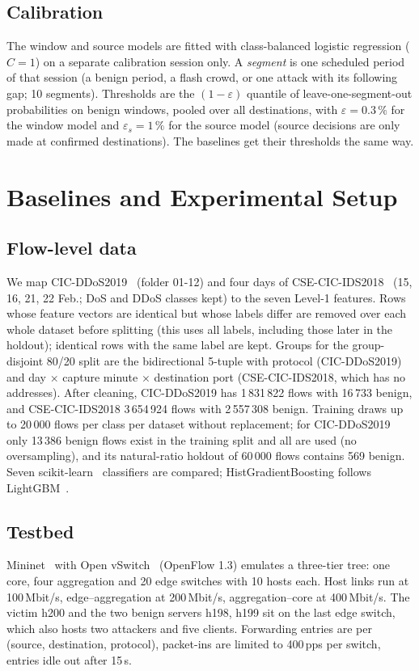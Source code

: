 \documentclass[conference]{IEEEtran}
\begin{document}
\subsection{Calibration}
The window and source models are fitted with class-balanced logistic regression ($C=1$) on a separate calibration session only. A \emph{segment} is one scheduled period of that session (a benign period, a flash crowd, or one attack with its following gap; 10 segments). Thresholds are the $(1-\varepsilon)$ quantile of leave-one-segment-out probabilities on benign windows, pooled over all destinations, with $\varepsilon=0.3\,\%$ for the window model and $\varepsilon_s=1\,\%$ for the source model (source decisions are only made at confirmed destinations). The baselines get their thresholds the same way.

\section{Baselines and Experimental Setup}\label{sec:setup}
\subsection{Flow-level data}
We map CIC-DDoS2019~\cite{sharafaldin2019ddos} (folder 01-12) and four days of CSE-CIC-IDS2018~\cite{sharafaldin2018toward} (15, 16, 21, 22 Feb.; DoS and DDoS classes kept) to the seven Level-1 features. Rows whose feature vectors are identical but whose labels differ are removed over each whole dataset before splitting (this uses all labels, including those later in the holdout); identical rows with the same label are kept. Groups for the group-disjoint 80/20 split are the bidirectional 5-tuple with protocol (CIC-DDoS2019) and day $\times$ capture minute $\times$ destination port (CSE-CIC-IDS2018, which has no addresses). After cleaning, CIC-DDoS2019 has 1\,831\,822 flows with 16\,733 benign, and CSE-CIC-IDS2018 3\,654\,924 flows with 2\,557\,308 benign. Training draws up to 20\,000 flows per class per dataset without replacement; for CIC-DDoS2019 only 13\,386 benign flows exist in the training split and all are used (no oversampling), and its natural-ratio holdout of 60\,000 flows contains 569 benign. Seven scikit-learn~\cite{pedregosa2011scikit} classifiers are compared; HistGradientBoosting follows LightGBM~\cite{ke2017lightgbm}.

\subsection{Testbed}
Mininet~\cite{lantz2010network} with Open vSwitch~\cite{pfaff2015ovs} (OpenFlow 1.3) emulates a three-tier tree: one core, four aggregation and 20 edge switches with 10 hosts each. Host links run at 100\,Mbit/s, edge--aggregation at 200\,Mbit/s, aggregation--core at 400\,Mbit/s. The victim h200 and the two benign servers h198, h199 sit on the last edge switch, which also hosts two attackers and five clients. Forwarding entries are per (source, destination, protocol), packet-ins are limited to 400\,pps per switch, entries idle out after 15\,s.
\end{document}
